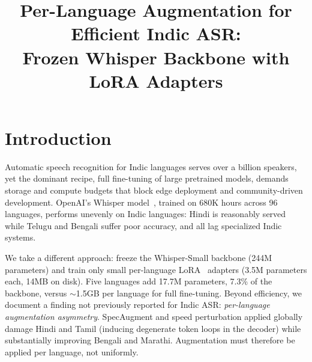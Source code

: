 \documentclass[9pt,a4paper,twocolumn]{article}
\title{Per-Language Augmentation for Efficient Indic ASR:\\ Frozen Whisper Backbone with LoRA Adapters}
\begin{document}

\section{Introduction}
Automatic speech recognition for Indic languages serves over a billion speakers, yet the dominant recipe, full fine-tuning of large pretrained models, demands storage and compute budgets that block edge deployment and community-driven development. OpenAI's Whisper model~\cite{radford2023robust}, trained on 680K hours across 96 languages, performs unevenly on Indic languages: Hindi is reasonably served while Telugu and Bengali suffer poor accuracy, and all lag specialized Indic systems.

We take a different approach: freeze the Whisper-Small backbone (244M parameters) and train only small per-language LoRA~\cite{hu2022lora} adapters (3.5M parameters each, 14MB on disk). Five languages add 17.7M parameters, 7.3\% of the backbone, versus $\sim$1.5GB per language for full fine-tuning. Beyond efficiency, we document a finding not previously reported for Indic ASR: \textit{per-language augmentation asymmetry}. SpecAugment and speed perturbation applied globally damage Hindi and Tamil (inducing degenerate token loops in the decoder) while substantially improving Bengali and Marathi. Augmentation must therefore be applied per language, not uniformly.
\end{document}
